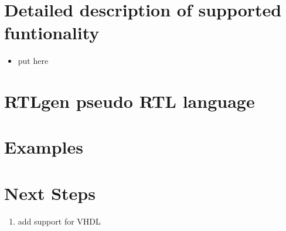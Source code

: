 \documentclass[11pt]{article}
\begin{document}
\section{Detailed description of supported funtionality}
\begin{itemize}
\item put here
\end{itemize}

\section{RTLgen pseudo RTL language}

\section{Examples}


\section{Next Steps}
\begin{enumerate}
\item add support for VHDL
\end{enumerate}

 
\end{document}

